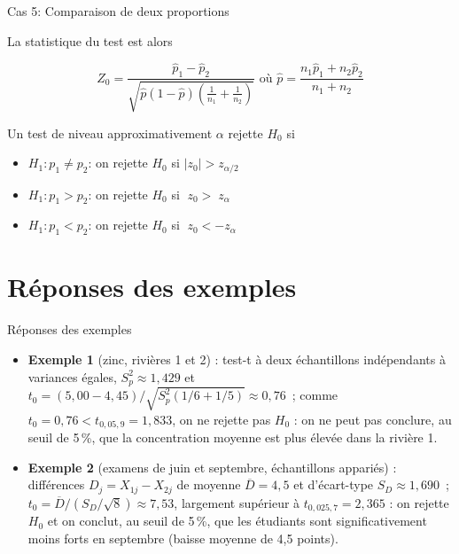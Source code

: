 \documentclass{BeamerTemplate}
\begin{document}
\begin{frame}[t]{Cas 5: Comparaison de deux proportions}

La statistique du test est alors

$$ Z_0 = \frac{\hat{p}_1 - \hat{p}_2}{ \sqrt{ \hat{p}(1-\hat{p}) \left( \frac{1}{n_1} + \frac{1}{n_2} \right) } } \mbox{ où } \hat{p} = \frac{n_1 \hat{p}_1 + n_2 \hat{p}_2}{n_1 + n_2} $$


\vspace{0.5cm}
Un test de niveau approximativement $\alpha$ rejette $H_0$ si

\begin{itemize}\itemsep4mm
\item $H_1 : p_1 \ne p_2$: on rejette $H_0$ si $|z_0| > z_{\alpha/2}$
\item $H_1 : p_1 > p_2$: on rejette $H_0$ si $\;z_0 > \;z_{\alpha}$
\item $H_1 : p_1 < p_2$: on rejette $H_0$ si $\;z_0 < -z_{\alpha}$
\end{itemize}

\end{frame}


\section{Réponses des exemples}

\begin{frame}[t]{Réponses des exemples}
\footnotesize
\begin{itemize}
\item \textbf{Exemple 1} (zinc, rivières 1 et 2) : test-t à deux échantillons indépendants à variances
égales, $S_p^2\approx1{,}429$ et $t_0=(5{,}00-4{,}45)/\sqrt{S_p^2(1/6+1/5)}\approx0{,}76$~; comme
$t_0=0{,}76 < t_{0{,}05,9}=1{,}833$, on ne rejette pas $H_0$ : on ne peut pas conclure, au seuil de
5\,\%, que la concentration moyenne est plus élevée dans la rivière 1.
\item \textbf{Exemple 2} (examens de juin et septembre, échantillons appariés) : différences
$D_j=X_{1j}-X_{2j}$ de moyenne $\overline D=4{,}5$ et d'écart-type $S_D\approx1{,}690$~; $t_0=
\overline D/(S_D/\sqrt{8})\approx7{,}53$, largement supérieur à $t_{0{,}025,7}=2{,}365$ : on rejette
$H_0$ et on conclut, au seuil de 5\,\%, que les étudiants sont significativement moins forts en
septembre (baisse moyenne de 4,5 points).
\end{itemize}

\end{frame}
\end{document}
